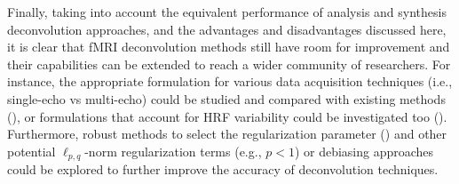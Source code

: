 Finally, taking into account the equivalent performance of analysis and synthesis deconvolution approaches, and the advantages and disadvantages discussed here, it is clear that fMRI deconvolution methods still have room for improvement and their capabilities can be extended to reach a wider community of researchers. For instance, the appropriate formulation for various data acquisition techniques (i.e., single-echo vs multi-echo) could be studied and compared with existing methods (\citealt{CaballeroGaudes2019deconvolutionalgorithmmulti}), or formulations that account for HRF variability could be investigated too (\citealt{Gaudes2012Structuredsparsedeconvolution,Badillo2013Grouplevelimpacts,Farouj2019BoldSignalDeconvolution}). Furthermore, robust methods to select the regularization parameter (\citealt{Meinshausen2010Stabilityselection,Urunuela2020StabilityBasedSparse}) and other potential \(\ell_{p,q}\)-norm regularization terms (e.g., \(p < 1\)) or debiasing approaches could be explored to further improve the accuracy of deconvolution techniques.
